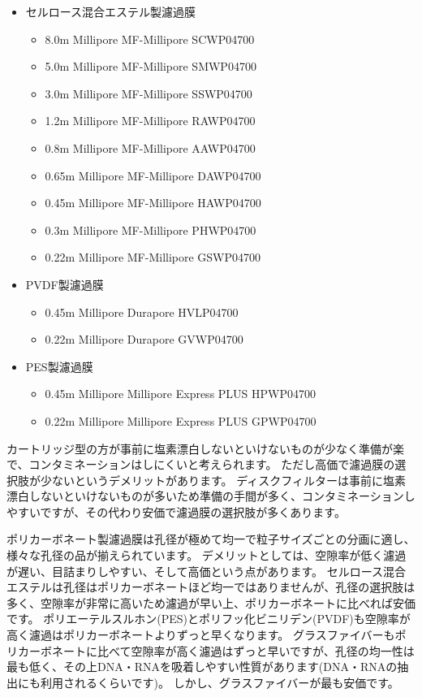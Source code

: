 \documentclass[titlepage,10pt,a4paper,uplatex]{jsbook}
\begin{document}
\begin{itemize}
\begin{itemize}
\begin{itemize}
\item 0.4{\textmu}m Millipore Isopore HTTP04700
\item 0.22{\textmu}m Millipore Isopore GTTP04700
\end{itemize}
\item セルロース混合エステル製濾過膜
\begin{itemize}
\item 8.0{\textmu}m Millipore MF-Millipore SCWP04700
\item 5.0{\textmu}m Millipore MF-Millipore SMWP04700
\item 3.0{\textmu}m Millipore MF-Millipore SSWP04700
\item 1.2{\textmu}m Millipore MF-Millipore RAWP04700
\item 0.8{\textmu}m Millipore MF-Millipore AAWP04700
\item 0.65{\textmu}m Millipore MF-Millipore DAWP04700
\item 0.45{\textmu}m Millipore MF-Millipore HAWP04700
\item 0.3{\textmu}m Millipore MF-Millipore PHWP04700
\item 0.22{\textmu}m Millipore MF-Millipore GSWP04700
\end{itemize}
\item PVDF製濾過膜
\begin{itemize}
\item 0.45{\textmu}m Millipore Durapore HVLP04700
\item 0.22{\textmu}m Millipore Durapore GVWP04700
\end{itemize}
\item PES製濾過膜
\begin{itemize}
\item 0.45{\textmu}m Millipore Millipore Express PLUS HPWP04700
\item 0.22{\textmu}m Millipore Millipore Express PLUS GPWP04700
\end{itemize}
\end{itemize}
\end{itemize}

カートリッジ型の方が事前に塩素漂白しないといけないものが少なく準備が楽で、コンタミネーションはしにくいと考えられます。
ただし高価で濾過膜の選択肢が少ないというデメリットがあります。
ディスクフィルターは事前に塩素漂白しないといけないものが多いため準備の手間が多く、コンタミネーションしやすいですが、その代わり安価で濾過膜の選択肢が多くあります。

ポリカーボネート製濾過膜は孔径が極めて均一で粒子サイズごとの分画に適し、様々な孔径の品が揃えられています。
デメリットとしては、空隙率が低く濾過が遅い、目詰まりしやすい、そして高価という点があります。
セルロース混合エステルは孔径はポリカーボネートほど均一ではありませんが、孔径の選択肢は多く、空隙率が非常に高いため濾過が早い上、ポリカーボネートに比べれば安価です。
ポリエーテルスルホン(PES)とポリフッ化ビニリデン(PVDF)も空隙率が高く濾過はポリカーボネートよりずっと早くなります。
グラスファイバーもポリカーボネートに比べて空隙率が高く濾過はずっと早いですが、孔径の均一性は最も低く、その上DNA・RNAを吸着しやすい性質があります(DNA・RNAの抽出にも利用されるくらいです)。
しかし、グラスファイバーが最も安価です。
\end{document}
